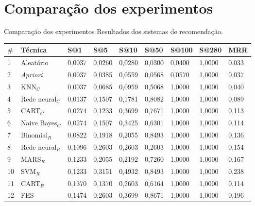 \section{Comparação dos experimentos}

\begin{frame}		
	\begin{block}{Comparação dos experimentos}
		Resultados dos sistemas de recomendação.
		\bgroup
		\begin{table}[!htp]
			\centering
			\tiny
			\begin{tabular}{|l|l|l|l|l|l|l|l|l|} \hline
				\textbf{\(\mathbf{\#}\)} & \textbf{Técnica}&\textbf{S@1}&\textbf{S@5} & \textbf{S@10} & \textbf{S@50} & \textbf{S@100} & \textbf{S@280} & \textbf{MRR} \\ \hline
				
\rowcolor{roxo}		1  & Aleatório				& 0,0037 & 0,0260 & 0,0280 & 0,0300 & 0,0400 & 1,0000 & 0.033 \\ \hline
\rowcolor{roxo}		2  & \emph{Apriori}			& 0,0037 & 0,0385 & 0,0559 & 0,0568 & 0,0570 & 1,0000 & 0,037 \\ \hline
\rowcolor{amarelo}	3  & KNN\(_C\)				& 0,0037 & 0,0685 & 0,0959 & 0,5068 & 1,0000 & 1,0000 & 0,040 \\ \hline
\rowcolor{amarelo}	4  & Rede neural\(_C\)		& 0,0137 & 0,1507 & 0,1781 & 0,8082 & 1,0000 & 1,0000 & 0,089 \\ \hline
\rowcolor{amarelo}	5  & CART\(_C\)				& 0,0274 & 0,1233 & 0,3699 & 0,7671 & 1,0000 & 1,0000 & 0,113 \\ \hline
\rowcolor{amarelo}	6  & Naive Bayes\(_C\)     	& 0,0274 & 0,1507 & 0,3425 & 0,6301 & 1,0000 & 1,0000 & 0,114 \\ \hline
\rowcolor{verde}	7  & Binomial\(_R\) 		& 0,0822 & 0,1918 & 0,2055 & 0,8493 & 1,0000 & 1,0000 & 0,136 \\ \hline
\rowcolor{verde}	8  & Rede neural\(_R\)     	& 0,1096 & 0,2603 & 0,2603 & 0,2603 & 1,0000 & 1,0000 & 0,154 \\ \hline
\rowcolor{verde}	9  & MARS\(_R\)     		& 0,1233 & 0,2055 & 0,2192 & 0,7260 & 1,0000 & 1,0000 & 0,167 \\ \hline
\rowcolor{verde}	10 & SVM\(_R\)     			& 0,1233 & 0,3151 & 0,4932 & 0,8493 & 1,0000 & 1,0000 & 0,238 \\ \hline
\rowcolor{verde}	11 & CART\(_R\)    			& 0,1370 & 0,1370 & 0,2603 & 0,6164 & 1,0000 & 1,0000 & 0,114 \\ \hline
\rowcolor{roxo}		12 & FES           			& 0,1474 & 0,2603 & 0,3699 & 0,8671 & 1,0000 & 1,0000 & 0,196 \\ \hline

\end{tabular}
\end{table}
\end{block}
\end{frame}
